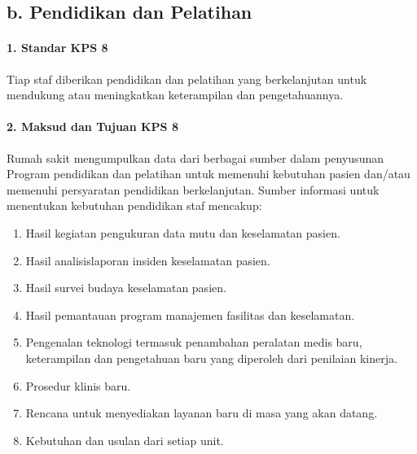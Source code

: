 \documentclass[
]{book}
\providecommand{\tightlist}{%
  \setlength{\itemsep}{0pt}\setlength{\parskip}{0pt}}
\begin{document}
\hypertarget{b.-pendidikan-dan-pelatihan}{%
\subsection*{b. Pendidikan dan Pelatihan}\label{b.-pendidikan-dan-pelatihan}}

\hypertarget{standar-kps-8}{%
\paragraph*{1. Standar KPS 8}\label{standar-kps-8}}

Tiap staf diberikan pendidikan dan pelatihan yang berkelanjutan untuk mendukung atau meningkatkan keterampilan dan pengetahuannya.

\hypertarget{maksud-dan-tujuan-kps-8}{%
\paragraph*{2. Maksud dan Tujuan KPS 8}\label{maksud-dan-tujuan-kps-8}}

Rumah sakit mengumpulkan data dari berbagai sumber dalam penyusunan Program pendidikan dan pelatihan untuk memenuhi kebutuhan pasien dan/atau memenuhi persyaratan pendidikan berkelanjutan. Sumber informasi untuk menentukan kebutuhan pendidikan staf mencakup:

\begin{enumerate}
\def\labelenumi{\alph{enumi}.}
\tightlist
\item
  Hasil kegiatan pengukuran data mutu dan keselamatan pasien.
\item
  Hasil analisislaporan insiden keselamatan pasien.
\item
  Hasil survei budaya keselamatan pasien.
\item
  Hasil pemantauan program manajemen fasilitas dan keselamatan.
\item
  Pengenalan teknologi termasuk penambahan peralatan medis baru, keterampilan dan pengetahuan baru yang diperoleh dari penilaian kinerja.
\item
  Prosedur klinis baru.
\item
  Rencana untuk menyediakan layanan baru di masa yang akan datang.
\item
  Kebutuhan dan usulan dari setiap unit.
\end{enumerate}
\end{document}
